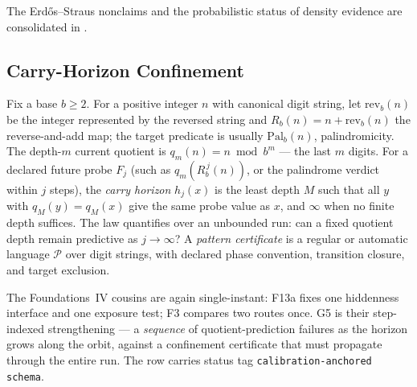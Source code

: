 \documentclass[11pt]{article}
\newcommand{\lawGFive}{Carry-Horizon Confinement}
\theoremstyle{definition}
\begin{document}
The Erd\H{o}s--Straus nonclaims and the probabilistic status of density evidence are consolidated in
.

\subsection{\lawGFive}\label{sec:clusterB:g5}

Fix a base $b \ge 2$. For a positive integer $n$ with canonical digit string, let $\mathrm{rev}_b(n)$
be the integer represented by the reversed string and $R_b(n) = n + \mathrm{rev}_b(n)$ the
reverse-and-add map; the target predicate is usually $\mathrm{Pal}_b(n)$, palindromicity. The
depth-$m$ current quotient is $q_m(n) = n \bmod b^m$ --- the last $m$ digits. For a declared future
probe $F_j$ (such as $q_m(R_b^{\,j}(n))$, or the palindrome verdict within $j$ steps), the
\emph{carry horizon} $h_j(x)$ is the least depth $M$ such that all $y$ with $q_M(y) = q_M(x)$ give
the same probe value as $x$, and $\infty$ when no finite depth suffices. The law quantifies over an
unbounded run: can a fixed quotient depth remain predictive as $j \to \infty$? A \emph{pattern
certificate} is a regular or automatic language $\mathcal{P}$ over digit strings, with declared phase
convention, transition closure, and target exclusion.

The Foundations~IV cousins are again single-instant: F13a fixes one hiddenness interface and one
exposure test; F3 compares two routes once. G5 is their step-indexed strengthening --- a
\emph{sequence} of quotient-prediction failures as the horizon grows along the orbit, against a
confinement certificate that must propagate through the entire run. The row carries status tag
\texttt{calibration-anchored schema}.
\end{document}
